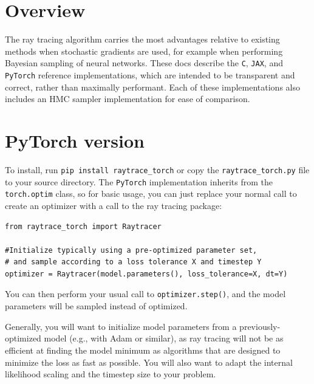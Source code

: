 \documentclass[12pt]{article}
\begin{document}

\section{Overview}
\label{overview}

The ray tracing algorithm carries the most advantages relative to existing methods when stochastic gradients are used, for example when performing Bayesian sampling of neural networks.  These docs describe the \texttt{C}, \texttt{JAX}, and \texttt{PyTorch} reference implementations, which are intended to be transparent and correct, rather than maximally performant.  Each of these implementations also includes an HMC sampler implementation for ease of comparison.


\section{PyTorch version}

To install, run \texttt{pip install raytrace\_torch} or copy the \texttt{raytrace\_torch.py} file to your source directory.  The \texttt{PyTorch} implementation inherits from the \texttt{torch.optim} class, so for basic usage, you can just replace your normal call to create an optimizer with a call to the ray tracing package:
\begin{lstlisting}
from raytrace_torch import Raytracer

#Initialize typically using a pre-optimized parameter set,
# and sample according to a loss tolerance X and timestep Y
optimizer = Raytracer(model.parameters(), loss_tolerance=X, dt=Y)
\end{lstlisting}
You can then perform your usual call to \lstinline{optimizer.step()}, and the model parameters will be sampled instead of optimized.

Generally, you will want to initialize model parameters from a previously-optimized model (e.g., with Adam or similar), as ray tracing will not be as efficient at finding the model minimum as algorithms that are designed to minimize the loss as fast as possible.  You will also want to adapt the internal likelihood scaling and the timestep size to your problem.
\end{document}
